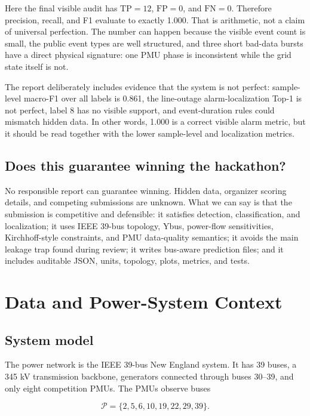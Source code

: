 \documentclass[11pt]{article}
\begin{document}
Here the final visible audit has $\mathrm{TP}=12$, $\mathrm{FP}=0$, and
$\mathrm{FN}=0$. Therefore precision, recall, and F1 evaluate to exactly 1.000.
That is arithmetic, not a claim of universal perfection. The number can happen
because the visible event count is small, the public event types are well
structured, and three short bad-data bursts have a direct physical signature:
one PMU phase is inconsistent while the grid state itself is not.

The report deliberately includes evidence that the system is not perfect:
sample-level macro-F1 over all labels is 0.861, the line-outage alarm-localization
Top-1 is not perfect, label 8 has no visible support, and event-duration rules
could mismatch hidden data. In other words, 1.000 is a correct visible alarm
metric, but it should be read together with the lower sample-level and
localization metrics.

\subsection{Does this guarantee winning the hackathon?}

No responsible report can guarantee winning. Hidden data, organizer scoring
details, and competing submissions are unknown. What we can say is that the
submission is competitive and defensible: it satisfies detection, classification,
and localization; it uses IEEE 39-bus topology, Ybus, power-flow sensitivities,
Kirchhoff-style constraints, and PMU data-quality semantics; it avoids the main
leakage trap found during review; it writes bus-aware prediction files; and it
includes auditable JSON, units, topology, plots, metrics, and tests.

\section{Data and Power-System Context}

\subsection{System model}

The power network is the IEEE 39-bus New England system. It has 39 buses, a
345 kV transmission backbone, generators connected through buses 30--39, and
only eight competition PMUs. The PMUs observe buses

\begin{equation}
  \mathcal{P} = \{2,5,6,10,19,22,29,39\}.
\end{equation}
\end{document}
